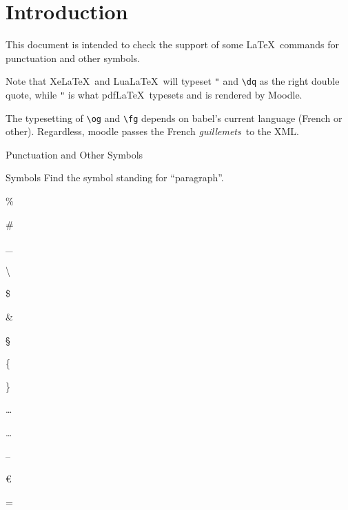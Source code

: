 \documentclass{article}
\begin{document}
\section*{Introduction}

This document is intended to check the support of some \LaTeX\ commands for 
punctuation and other symbols.

Note that Xe\LaTeX\ and Lua\LaTeX\ will typeset \verb|"| and \verb|\dq| as the 
right double quote, while \verb|"| is what pdf\LaTeX\ typesets and is rendered 
by Moodle.

The typesetting of \verb|\og| and \verb|\fg| depends on 
\textsf{babel}'s current language (French or other). Regardless, 
\textsf{moodle} passes the French \og \emph{guillemets}\fg\ to the XML.

\begin{quiz}[points=1,shuffle=false]{Punctuation and Other Symbols}
\ifPDFTeX
  \NoAutoSpacing%
\fi
\begin{multi}{Symbols}
Find the symbol standing for ``paragraph''.
\item \%
\item \#
\item \_
\item \textbackslash
\item \$
\item \&
\item* \S
\item \{
\item \}
\item \texteuro
\item \dots
\item \ldots
\item \textexclamdown
\item \textquestiondown
\item --
\item \euro
\item =
\end{multi}


\end{quiz}
\end{document}
